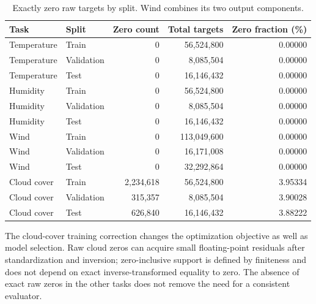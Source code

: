 \documentclass[10pt,a4paper]{article}
\begin{document}
\begin{table}[H]\centering\small\setlength{\tabcolsep}{5pt}\setlength{\parskip}{0pt}

\caption{Exactly zero raw targets by split. Wind combines its two output components.}\label{tab:zeros}

\begin{tabular}{llrrr}

\toprule
Task & Split & Zero count & Total targets & Zero fraction (\%) \\
\midrule

Temperature & Train & 0 & 56,524,800 & 0.00000 \\

Temperature & Validation & 0 & 8,085,504 & 0.00000 \\

Temperature & Test & 0 & 16,146,432 & 0.00000 \\

Humidity & Train & 0 & 56,524,800 & 0.00000 \\

Humidity & Validation & 0 & 8,085,504 & 0.00000 \\

Humidity & Test & 0 & 16,146,432 & 0.00000 \\

Wind & Train & 0 & 113,049,600 & 0.00000 \\

Wind & Validation & 0 & 16,171,008 & 0.00000 \\

Wind & Test & 0 & 32,292,864 & 0.00000 \\

Cloud cover & Train & 2,234,618 & 56,524,800 & 3.95334 \\

Cloud cover & Validation & 315,357 & 8,085,504 & 3.90028 \\

Cloud cover & Test & 626,840 & 16,146,432 & 3.88222 \\

\bottomrule\end{tabular}\end{table}

The cloud-cover training correction changes the optimization objective as well as model selection. Raw cloud zeros can acquire small floating-point residuals after standardization and inversion; zero-inclusive support is defined by finiteness and does not depend on exact inverse-transformed equality to zero. The absence of exact raw zeros in the other tasks does not remove the need for a consistent evaluator.
\end{document}
